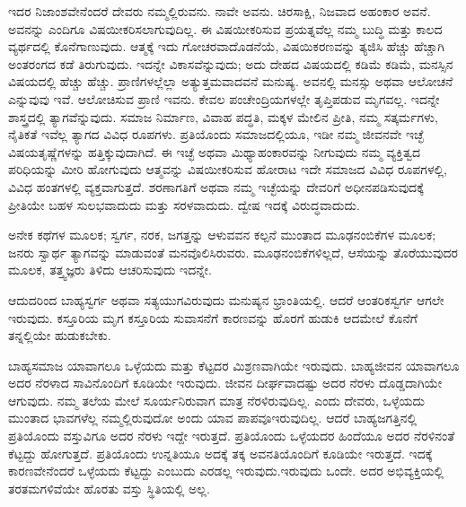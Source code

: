 ಇದರ ನಿಜಾಂಶವೇನೆಂದರೆ ದೇವರು ನಮ್ಮಲ್ಲಿರುವನು. ನಾವೇ ಅವನು. ಚಿರಸಾಕ್ಷಿ, ನಿಜವಾದ ಅಹಂಕಾರ ಅವನೆ. ಅವನನ್ನು ಎಂದಿಗೂ ವಿಷಯೀಕರಿಸಲಾಗುವುದಿಲ್ಲ. ಈ ವಿಷಯೀಕರಿಸುವ ಪ್ರಯತ್ನವೆಲ್ಲ ನಮ್ಮ ಬುದ್ಧಿ ಮತ್ತು ಕಾಲದ ವ್ಯರ್ಥದಲ್ಲಿ ಕೊನೆಗಾಣುವುದು. ಆತ್ಮಕ್ಕೆ ಇದು ಗೋಚರವಾದೊಡನೆಯೆ, ವಿಷಯಿಕರಣವನ್ನು ತ್ಯಜಿಸಿ ಹೆಚ್ಚು ಹೆಚ್ಚಾಗಿ ಅಂತರಂಗದ ಕಡೆ ತಿರುಗುವುದು. ಇದನ್ನೇ ವಿಕಾಸವೆನ್ನುವುದು; ಅದು ದೇಹದ ವಿಷಯದಲ್ಲಿ ಕಡಿಮೆ ಕಡಿಮೆ, ಮನಸ್ಸಿನ ವಿಷಯದಲ್ಲಿ ಹೆಚ್ಚು ಹೆಚ್ಚು. ಪ್ರಾಣಿಗಳಲ್ಲೆಲ್ಲಾ ಅತ್ಯುತ್ತಮವಾದವನೆ ಮನುಷ್ಯ. ಅವನಲ್ಲಿ ಮನಸ್ಸು ಅಥವಾ ಆಲೋಚನೆ ಎನ್ನುವುವು ಇವೆ. ಆಲೋಚಿಸುವ ಪ್ರಾಣಿ ಇವನು. ಕೇವಲ ಪಂಚೇಂದ್ರಿಯಗಳಲ್ಲೇ ತೃಪ್ತಿಪಡುವ ಮೃಗವಲ್ಲ. ಇದನ್ನೇ ಶಾಸ್ತ್ರದಲ್ಲಿ ತ್ಯಾಗವೆನ್ನುವುದು. ಸಮಾಜ ನಿರ್ಮಾಣ, ವಿವಾಹ ಪದ್ಧತಿ, ಮಕ್ಕಳ ಮೇಲಿನ ಪ್ರೀತಿ, ನಮ್ಮ ಸತ್ಕರ್ಮಗಳು, ನೈತಿಕತೆ \enginline{-} ಇವೆಲ್ಲ ತ್ಯಾಗದ ವಿವಿಧ ರೂಪಗಳು. ಪ್ರತಿಯೊಂದು ಸಮಾಜದಲ್ಲಿಯೂ, ಇಡೀ ನಮ್ಮ ಜೀವನವೇ ಇಚ್ಛೆ ವಿಷಯತೃಷ್ಣೆಗಳನ್ನು ಹತ್ತಿಕ್ಕುವುದಾಗಿದೆ. ಈ ಇಚ್ಛೆ ಅಥವಾ ಮಿಥ್ಯಾಹಂಕಾರವನ್ನು ನೀಗುವುದು\enginline{-} ನಮ್ಮ ವ್ಯಕ್ತಿತ್ವದ ಪರಿಧಿಯನ್ನು ಮೀರಿ ಹೋಗುವುದು\enginline{-} ಆತ್ಮವನ್ನು ವಿಷಯೀಕರಿಸುವ ಹೋರಾಟ \enginline{-} ಇದೇ ಸಮಾಜದ ವಿವಿಧ ರೂಪಗಳಲ್ಲಿ, ವಿವಿಧ ಹಂತಗಳಲ್ಲಿ ವ್ಯಕ್ತವಾಗುತ್ತದೆ. ಶರಣಾಗತಿಗೆ ಅಥವಾ ನಮ್ಮ ಇಚ್ಛೆಯನ್ನು ದೇವರಿಗೆ ಅಧೀನಪಡಿಸುವುದಕ್ಕೆ ಪ್ರೀತಿಯೇ ಬಹಳ ಸುಲಭವಾದುದು ಮತ್ತು ಸರಳವಾದುದು. ದ್ವೇಷ ಇದಕ್ಕೆ ವಿರುದ್ಧವಾದುದು.

ಅನೇಕ ಕಥೆಗಳ ಮೂಲಕ; ಸ್ವರ್ಗ, ನರಕ, ಜಗತ್ತನ್ನು ಆಳುವವನ ಕಲ್ಪನೆ ಮುಂತಾದ ಮೂಢನಂಬಿಕೆಗಳ ಮೂಲಕ; ಜನರು ಸ್ವಾರ್ಥ ತ್ಯಾಗವನ್ನು ಮಾಡುವಂತೆ ಮನವೊಲಿಸಿರುವರು. ಮೂಢನಂಬಿಕೆಗಳಿಲ್ಲದೆ, ಆಸೆಯನ್ನು ತೊರೆಯುವುದರ ಮೂಲಕ, ತತ್ತ್ವಜ್ಞರು ತಿಳಿದು ಆಚರಿಸುವುದು ಇದನ್ನೇ.

ಆದುದರಿಂದ ಬಾಹ್ಯಸ್ವರ್ಗ ಅಥವಾ ಸತ್ಯಯುಗವಿರುವುದು ಮನುಷ್ಯನ \hbox{ಭ್ರಾಂತಿಯಲ್ಲಿ.} ಆದರೆ ಆಂತರಿಕಸ್ವರ್ಗ ಆಗಲೇ ಇರುವುದು. ಕಸ್ತೂರಿಯ ಮೃಗ ಕಸ್ತೂರಿಯ ಸುವಾಸನೆಗೆ ಕಾರಣವನ್ನು ಹೊರಗೆ ಹುಡುಕಿ ಆದಮೇಲೆ ಕೊನೆಗೆ ತನ್ನಲ್ಲಿಯೇ ಹುಡುಕಬೇಕು.

ಬಾಹ್ಯಸಮಾಜ ಯಾವಾಗಲೂ ಒಳ್ಳೆಯದು ಮತ್ತು ಕೆಟ್ಟದರ ಮಿಶ್ರಣವಾಗಿಯೇ ಇರುವುದು. ಬಾಹ್ಯಜೀವನ ಯಾವಾಗಲೂ ಅದರ ನೆರಳಾದ ಸಾವಿನೊಂದಿಗೆ ಕೂಡಿಯೇ ಇರುವುದು. ಜೀವನ ದೀರ್ಘವಾದಷ್ಟು ಅದರ ನೆರಳು ದೊಡ್ಡದಾಗಿಯೇ ಆಗುವುದು. ನಮ್ಮ ತಲೆಯ ಮೇಲೆ ಸೂರ್ಯನಿರುವಾಗ ಮಾತ್ರ ನೆರಳಿರುವುದಿಲ್ಲ. ಎಂದು ದೇವರು, ಒಳ್ಳೆಯದು ಮುಂತಾದ ಭಾವಗಳೆಲ್ಲ ನಮ್ಮಲ್ಲಿರುವುದೋ ಅಂದು ಯಾವ ಪಾಪವೂ\break ಇರುವುದಿಲ್ಲ. ಆದರೆ ಬಾಹ್ಯಜಗತ್ತಿನಲ್ಲಿ ಪ್ರತಿಯೊಂದು ವಸ್ತುವಿಗೂ ಅದರ ನೆರಳು ಇದ್ದೇ ಇರುತ್ತದೆ. ಪ್ರತಿಯೊಂದು ಒಳ್ಳೆಯದರ ಹಿಂದೆಯೂ ಅದರ ನೆರಳಿನಂತೆ ಕೆಟ್ಟದ್ದು ಹೋಗು\break ತ್ತದೆ. ಪ್ರತಿಯೊಂದು ಉನ್ನತಿಯೂ ಅದಕ್ಕೆ ತಕ್ಕ ಅವನತಿಯೊಂದಿಗೆ ಕೂಡಿಯೇ ಇರುತ್ತದೆ. ಇದಕ್ಕೆ ಕಾರಣವೇನೆಂದರೆ ಒಳ್ಳೆಯದು ಕೆಟ್ಟದ್ದು ಎಂಬುದು ಎರಡಲ್ಲ ಇರುವುದು.\break ಇರುವುದು ಒಂದೇ. ಅದರ ಅಭಿವ್ಯಕ್ತಿಯಲ್ಲಿ ತರತಮಗಳಿವೆಯೇ ಹೊರತು ವಸ್ತು ಸ್ಥಿತಿಯಲ್ಲಿ ಅಲ್ಲ.


